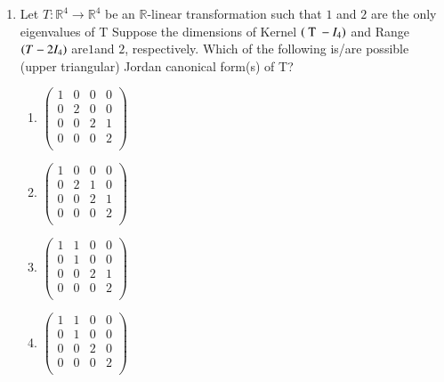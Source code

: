 \documentclass[journal]{IEEEtran}
\begin{document}
\begin{enumerate} [start=53]
\begin{enumerate}
    \item S is closed in $\brak{C\brak{\sbrak{0,1}},d}$
    \item S is bounded in $\brak{C\brak{\sbrak{0,1}},d}$
    \item S is compact in $\brak{C\brak{\sbrak{0,1}},d}$
\end{enumerate}
\bigskip
\item Let $T:\mathbb{R}^{4}\to\mathbb{R}^{4}$ be an $\mathbb{R}$-linear transformation such that $1$ and $2$ are the only eigenvalues of T Suppose the dimensions of Kernel $\left(\text{ T }-I_{4}\right)$ and  Range$\left(T-2 I_{4}\right)$
are$ 1 $and $2$, respectively. Which of the following is/are possible (upper triangular) Jordan canonical form(s) of T?
\begin{enumerate}
    \item $\begin{pmatrix}
1 & 0 & 0 & 0 \\
0 & 2 & 0 & 0 \\
0 & 0 & 2 & 1 \\
0 & 0 & 0 & 2 \\
\end{pmatrix}$
\item $\begin{pmatrix}
1 & 0 & 0 & 0 \\
0 & 2 & 1 & 0 \\
0 & 0 & 2 & 1 \\
0 & 0 & 0 & 2 \\
\end{pmatrix}$
\item $\begin{pmatrix}
1 & 1 & 0 & 0 \\
0 & 1 & 0 & 0 \\
0 & 0 & 2 & 1 \\
0 & 0 & 0 & 2 \\
\end{pmatrix}$
\item $\begin{pmatrix}
1 & 1 & 0 & 0 \\
0 & 1 & 0 & 0 \\
0 & 0 & 2 & 0 \\
0 & 0 & 0 & 2 \\
\end{pmatrix}$


\end{enumerate}
\end{enumerate}
\end{document}
